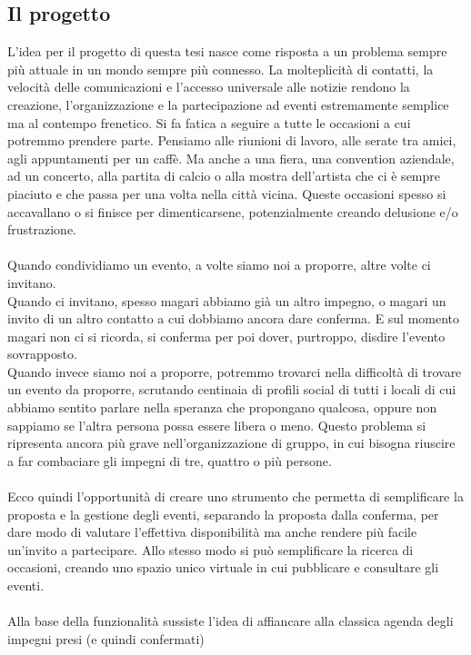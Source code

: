 \subsection{Il progetto}

L'idea per il progetto di questa tesi nasce come risposta a un problema sempre più attuale in un mondo sempre più connesso.
La molteplicità di contatti, la velocità delle comunicazioni e l'accesso universale alle notizie 
rendono la creazione, l'organizzazione e la partecipazione ad eventi estremamente semplice ma al contempo frenetico.
Si fa fatica a seguire a tutte le occasioni a cui potremmo prendere parte.
Pensiamo alle riunioni di lavoro, alle serate tra amici, agli appuntamenti per un caffè.
Ma anche a una fiera, una convention aziendale, ad un concerto, alla partita di calcio o alla mostra dell'artista che ci è sempre piaciuto e che passa per una volta nella città vicina.
Queste occasioni spesso si accavallano o si finisce per dimenticarsene, potenzialmente creando delusione e/o frustrazione.\\
\\
Quando condividiamo un evento, a volte siamo noi a proporre, altre volte ci invitano. \\
Quando ci invitano, spesso magari abbiamo già un altro impegno, o magari un invito di un altro contatto a cui dobbiamo ancora dare conferma. 
E sul momento magari non ci si ricorda, si conferma per poi dover, purtroppo, disdire l'evento sovrapposto.\\
Quando invece siamo noi a proporre, potremmo trovarci nella difficoltà di trovare un evento da proporre, 
scrutando centinaia di profili social di tutti i locali di cui abbiamo sentito parlare nella speranza che propongano qualcosa, 
oppure non sappiamo se l'altra persona possa essere libera o meno. 
Questo problema si ripresenta ancora più grave nell'organizzazione di gruppo, in cui bisogna riuscire a far combaciare gli impegni di tre, quattro o più persone.\\
\\
Ecco quindi l'opportunità di creare uno strumento che permetta di semplificare la proposta e la gestione degli eventi, 
separando la proposta dalla conferma, per dare modo di valutare l'effettiva disponibilità ma anche rendere più facile un'invito a partecipare.
Allo stesso modo si può semplificare la ricerca di occasioni, creando uno spazio unico virtuale in cui pubblicare e consultare gli eventi.\\
\\
Alla base della funzionalità sussiste l'idea di affiancare alla classica agenda degli impegni presi (e quindi confermati) 
